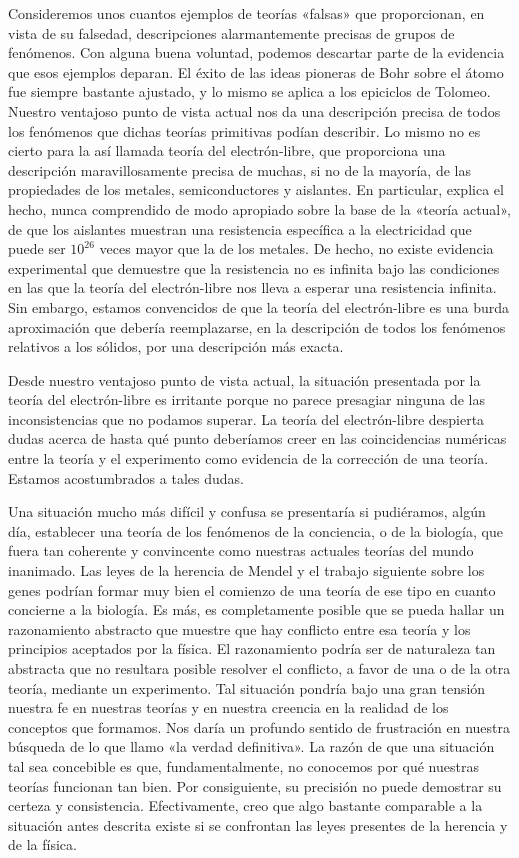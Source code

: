 \documentclass[a4paper, 12pt]{article}
\begin{document}
Consideremos unos cuantos ejemplos de teorías «falsas» que proporcionan, en vista de su falsedad, descripciones alarmantemente precisas de grupos de fenómenos. Con alguna buena voluntad, podemos descartar parte de la evidencia que esos ejemplos deparan. El éxito de las ideas pioneras de Bohr sobre el átomo fue siempre bastante ajustado, y lo mismo se aplica a los epiciclos de Tolomeo. Nuestro ventajoso punto de vista actual nos da una descripción precisa de todos los fenómenos que dichas teorías primitivas podían describir. Lo mismo no es cierto para la así llamada teoría del electrón-libre, que proporciona una descripción maravillosamente precisa de muchas, si no de la mayoría, de las propiedades de los metales, semiconductores y aislantes. En particular, explica el hecho, nunca comprendido de modo apropiado sobre la base de la «teoría actual», de que los aislantes muestran una resistencia específica a la electricidad que puede ser $10^{26}$ veces mayor que la de los metales. De hecho, no existe evidencia experimental que demuestre que la resistencia no es infinita bajo las condiciones en las que la teoría del electrón-libre nos lleva a esperar una resistencia infinita. Sin embargo, estamos convencidos de que la teoría del electrón-libre es una burda aproximación que debería reemplazarse, en la descripción de todos los fenómenos relativos a los sólidos, por una descripción más exacta.

Desde nuestro ventajoso punto de vista actual, la situación presentada por la teoría del electrón-libre es irritante porque no parece presagiar ninguna de las inconsistencias que no podamos superar. La teoría del electrón-libre despierta dudas acerca de hasta qué punto deberíamos creer en las coincidencias numéricas entre la teoría y el experimento como evidencia de la corrección de una teoría. Estamos acostumbrados a tales dudas. 

Una situación mucho más difícil y confusa se presentaría si pudiéramos, algún día, establecer una teoría de los fenómenos de la conciencia, o de la biología, que fuera tan coherente y convincente como nuestras actuales teorías del mundo inanimado. Las leyes de la herencia de Mendel y el trabajo siguiente sobre los genes podrían formar muy bien el comienzo de una teoría de ese tipo en cuanto concierne a la biología. Es más, es completamente posible que se pueda hallar un razonamiento abstracto que muestre que hay conflicto entre esa teoría y los principios aceptados por la física. El razonamiento podría ser de naturaleza tan abstracta que no resultara posible resolver el conflicto, a favor de una o de la otra teoría, mediante un experimento. Tal situación pondría bajo una gran tensión nuestra fe en nuestras teorías y en nuestra creencia en la realidad de los conceptos que formamos. Nos daría un profundo sentido de frustración en nuestra búsqueda de lo que llamo «la verdad definitiva». La razón de que una situación tal sea concebible es que, fundamentalmente, no conocemos por qué nuestras teorías funcionan tan bien. Por consiguiente, su precisión no puede demostrar su certeza y consistencia. Efectivamente, creo que algo bastante comparable a la situación antes descrita existe si se confrontan las leyes presentes de la herencia y de la física.
\end{document}
